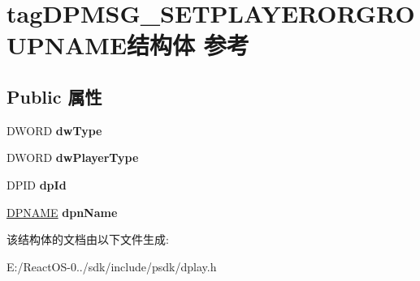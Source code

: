 \hypertarget{structtag_d_p_m_s_g___s_e_t_p_l_a_y_e_r_o_r_g_r_o_u_p_n_a_m_e}{}\section{tag\+D\+P\+M\+S\+G\+\_\+\+S\+E\+T\+P\+L\+A\+Y\+E\+R\+O\+R\+G\+R\+O\+U\+P\+N\+A\+M\+E结构体 参考}
\label{structtag_d_p_m_s_g___s_e_t_p_l_a_y_e_r_o_r_g_r_o_u_p_n_a_m_e}
\subsection*{Public 属性}
\begin{DoxyCompactItemize}
\item 
\mbox{\label{structtag_d_p_m_s_g___s_e_t_p_l_a_y_e_r_o_r_g_r_o_u_p_n_a_m_e_a7ff93015b57eefc761a43d62e357b676}} 
D\+W\+O\+RD {\bfseries dw\+Type}
\item 
\mbox{\label{structtag_d_p_m_s_g___s_e_t_p_l_a_y_e_r_o_r_g_r_o_u_p_n_a_m_e_a95bb401fde102a932fc9c0f5276a3652}} 
D\+W\+O\+RD {\bfseries dw\+Player\+Type}
\item 
\mbox{\label{structtag_d_p_m_s_g___s_e_t_p_l_a_y_e_r_o_r_g_r_o_u_p_n_a_m_e_a0d6befea9e6fe7d5d26dd44aef403829}} 
D\+P\+ID {\bfseries dp\+Id}
\item 
\mbox{\label{structtag_d_p_m_s_g___s_e_t_p_l_a_y_e_r_o_r_g_r_o_u_p_n_a_m_e_ae4854b9eece889d6a0895dffb884493e}} 
\hyperlink{structtag_d_p_n_a_m_e}{D\+P\+N\+A\+ME} {\bfseries dpn\+Name}
\end{DoxyCompactItemize}


该结构体的文档由以下文件生成\+:\begin{DoxyCompactItemize}
\item 
E\+:/\+React\+O\+S-\/0../sdk/include/psdk/dplay.\+h\end{DoxyCompactItemize}
